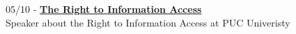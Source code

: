 \documentclass[]{friggeri-cv}
\begin{document}
05/10 - \href{http://artigo19.org/infoedireitoseu/?p=560}{\textbf{The Right to Information Access}}\\
Speaker about the Right to Information Access at PUC Univeristy
%
%
%
%
% 
\end{document}
